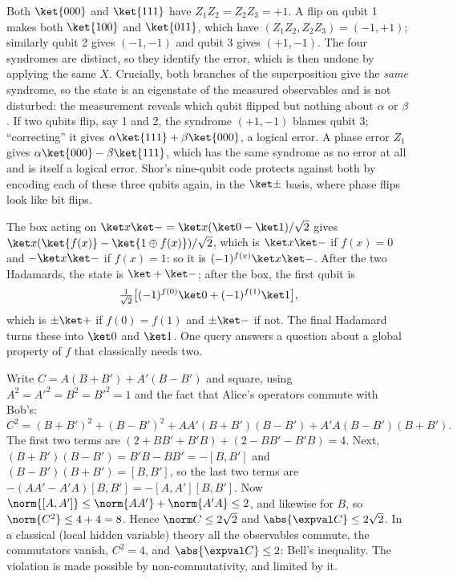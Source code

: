  Both $\ket{000}$ and $\ket{111}$ have $Z_1Z_2 = Z_2Z_3 = +1$. A flip on qubit 1 makes both $\ket{100}$ and $\ket{011}$, which have $(Z_1Z_2, Z_2Z_3) = (-1,+1)$; similarly qubit 2 gives $(-1,-1)$ and qubit 3 gives $(+1,-1)$. The four syndromes are distinct, so they identify the error, which is then undone by applying the same $X$. Crucially, both branches of the superposition give the \emph{same} syndrome, so the state is an eigenstate of the measured observables and is not disturbed: the measurement reveals which qubit flipped but nothing about $\alpha$ or $\beta$. If two qubits flip, say 1 and 2, the syndrome $(+1,-1)$ blames qubit 3; ``correcting'' it gives $\alpha\ket{111}+\beta\ket{000}$, a logical error. A phase error $Z_1$ gives $\alpha\ket{000}-\beta\ket{111}$, which has the same syndrome as no error at all and is itself a logical error. Shor's nine-qubit code protects against both by encoding each of these three qubits again, in the $\ket\pm$ basis, where phase flips look like bit flips.

 The box acting on $\ket x\ket- = \ket x(\ket0-\ket1)/\sqrt2$ gives $\ket x(\ket{f(x)}-\ket{1\oplus f(x)})/\sqrt2$, which is $\ket x\ket-$ if $f(x) = 0$ and $-\ket x\ket-$ if $f(x)=1$: so it is $(-1)^{f(x)}\ket x\ket-$. After the two Hadamards, the state is $\ket+\ket-$; after the box, the first qubit is
\[
  \tfrac{1}{\sqrt2}\big[(-1)^{f(0)}\ket0 + (-1)^{f(1)}\ket1\big],
\]
which is $\pm\ket+$ if $f(0) = f(1)$ and $\pm\ket-$ if not. The final Hadamard turns these into $\ket0$ and $\ket1$. One query answers a question about a global property of $f$ that classically needs two.

 Write $C = A(B+B') + A'(B-B')$ and square, using $A^2 = A'^2 = B^2 = B'^2 = 1$ and the fact that Alice's operators commute with Bob's:
\[
  C^2 = (B+B')^2 + (B-B')^2 + AA'(B+B')(B-B') + A'A(B-B')(B+B').
\]
The first two terms are $(2 + BB'+B'B) + (2 - BB'-B'B) = 4$. Next, $(B+B')(B-B') = B'B - BB' = -[B,B']$ and $(B-B')(B+B') = [B,B']$, so the last two terms are $-(AA' - A'A)[B,B'] = -[A,A'][B,B']$. Now $\norm{[A,A']}\le\norm{AA'}+\norm{A'A}\le2$, and likewise for $B$, so $\norm{C^2}\le4+4 = 8$. Hence $\norm C\le2\sqrt2$ and $\abs{\expval C}\le2\sqrt2$. In a classical (local hidden variable) theory all the observables commute, the commutators vanish, $C^2 = 4$, and $\abs{\expval C}\le2$: Bell's inequality. The violation is made possible by non-commutativity, and limited by it.
